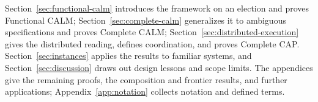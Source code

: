 Section~\ref{sec:functional-calm} introduces the framework on an election and
proves Functional CALM; Section~\ref{sec:complete-calm} generalizes it to
ambiguous specifications and proves Complete CALM;
Section~\ref{sec:distributed-execution} gives the distributed reading, defines
coordination, and proves Complete CAP.  Section~\ref{sec:instances} applies the
results to familiar systems, and Section~\ref{sec:discussion} draws out design
lessons and scope limits.  The appendices give the remaining proofs, the
composition and frontier results, and further applications;
Appendix~\ref{app:notation} collects notation and defined terms.
